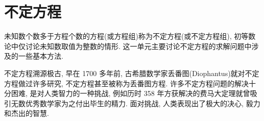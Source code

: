 \begin{comment}
31 已知正整数 $c$ 是一个奇合数. 证明: 存在正整数 $a$ , 使得 $a \leqslant \frac{c}{3}-1$ , 且 $(2 a-1)^{2}+8 c$ 是一个完全平方数.\\
32 设整数 $a ,  b$ 满足: 对任意正整数 $n$ , 数 $2^{n} \cdot a+b$ 都是完全平方数. 证明:  $a=0$.\\
33 求不能表示为 42 的正倍数与一个合数之和的最大正整数. \\
34 求一个正整数 $n$ , 使得数 $n, n+1, \cdots, n+20$ 中每个数都与 30030 不互素. \\
35 是否存在连续 13 个正整数, 其中每个数都是 $2 ,  3 ,  5 ,  7 ,  11$ 中的某个数的倍数？连续 14 个呢？\\
36 设 $p$ 为素数,  $a ,  n$ 都是正整数, 且 $2^{p}+3^{p}=a^{n}$ . 证明:  $n=1$ . \\
37 圆周上排列着 2000 个点, 在某个点上标上数 1 , 按顺时针方向数两个点, 在其上标数 2 , 再数 3 个点标数 3 , 依此继续, 标出数 $1,2, \cdots, 2000$. 这样, 有些点上没有标数, 有些点上所标的数不止一个. 问: 被标上 2000 的那个点上所标的数中最小的是多少?\\
38 圆周上有 800 个点, 依顺时针方向标号为 $1,2, \cdots, 800$ , 它们将圆周分为 800 个间隙. 现在选定某个点, 将其染上红色, 然后进行下述操作: 如果第 $k$ 号点染成了红色, 那么依顺时针方向转过 $k$ 个间隙, 将所到达的点染成红色. 问: 依此规则, 圆周上最多有多少个点被染成了红色？证明你的结论. \\
39 设 $m$ 为正整数, 且 $m \equiv 2(\bmod 4)$ . 证明: 至多存在一对正整数 $(a, b)$ , 使得 $m=a b$ , 且 $0<a-b<\sqrt{5+4 \sqrt{4 m+1}}$ . \\
40 设 $n$ 是一个大于 10 的正整数, 且 $n$ 的每个数码都为 $1 ,  3 ,  7$ 或 9 . 证明: $n$有一个大于 10 的素因子. \\
41 求所有的素数对 $(p, q)$ , 使得 $p q \mid p^{p}+q^{q}+1$ . \\
42 设 $f(n)=1+n+n^{2}+\cdots+n^{2010}$ . 证明: 对任意整数 $m$ , 若 $2 \leqslant m \leqslant 2010$ , 则不存在正整数 $n$, 使得 $m \mid f(n)$.\\
43 是否存在整数 $x ,  y$ , 使得 $x^{2012}-2010=4 y^{2011}+4 y^{2010}+2011 y$ ？
\end{comment}

\section{不定方程}
未知数个数多于方程个数的方程(或方程组)称为不定方程(或不定方程组), 初等数论中仅讨论未知数取值为整数的情形. 这一单元主要讨论不定方程的求解问题中涉及的一些基本方法.

不定方程溯源极古, 早在 1700 多年前, 古希腊数学家丢番图(Diophantus)就对不定方程做过许多研究, 不定方程甚至被称为丢番图方程. 许多不定方程问题的解决十分困难, 是对人类智力的一种挑战, 例如历时 358 年方获解决的费马大定理就曾吸引无数优秀数学家为之付出毕生的精力. 面对挑战, 人类表现出了极大的决心, 毅力和杰出的智慧.

